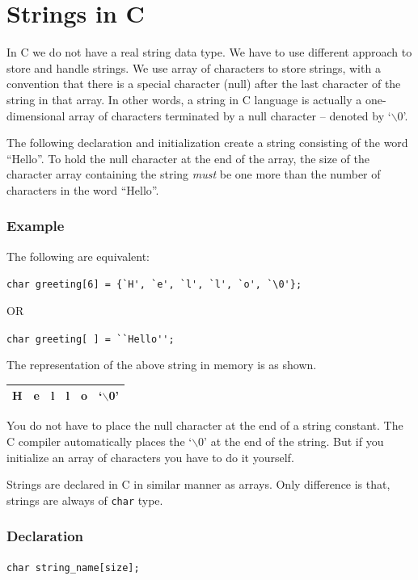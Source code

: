 \documentclass[11pt,a4paper]{article}
\author{TalentSprint}
\date{}
\begin{document}
\section*{Strings in C}
In C we do not have a real string data type. We have to use different approach to store and handle strings. We use array of characters to store strings, with a convention that there is a special character (null) after the last character of the string in that array. In other words, a string in C language is actually a one-dimensional array of characters terminated by a null character -- denoted by `$\backslash$0'. 

The following declaration and initialization create a string consisting of the word ``Hello''. To hold the null character at the end of the array, the size of the character array containing the string \emph{must} be one more than the number of characters in the word ``Hello''.

\subsubsection*{Example}
The following are equivalent:

\lstinline!char greeting[6] = {`H', `e', `l', `l', `o', `\0'};!

 OR

\lstinline!char greeting[ ] = ``Hello'';!

The representation of the above string in memory is as shown.

\begin{table}[ht]
\centering
\begin{tabular}{|c|c|c|c|c|c|}\hline
H & e & l & l & o & `$\backslash$0'\\\hline
\end{tabular}
\end{table}

You do not have to place the null character at the end of a string constant. The C compiler automatically places the `$\backslash$0' at the end of the string. But if you initialize an array of characters you have to do it yourself.

Strings are declared in C in similar manner as arrays. Only difference is that, strings are always of \lstinline!char! type.

\subsubsection*{Declaration}
\lstinline!char string_name[size];!
\end{document}
